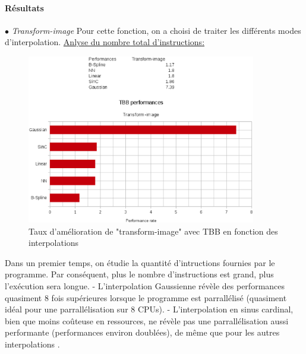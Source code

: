 \documentclass{report}
\begin{document}
\paragraph{Résultats} 
{$\bullet$} \textit{Transform-image} \newline
Pour cette fonction, on a choisi de traiter les différents modes d'interpolation.\newline\newline  
\underline{Anlyse du nombre total d'instructions:} \newline  
\begin{figure}
	\includegraphics[width=10cm]{figures/performances_tbb_transform_image.eps}	
	\caption{Taux d'amélioration de "transform-image" avec TBB en fonction des interpolations}
	\label{Taux d'amélioration de "transform-image" avec TBB en fonction des interpolations}
\end{figure}

Dans un premier temps, on étudie la quantité d'intructions fournies par le programme. Par conséquent, plus le nombre d'instructions est grand, plus l'exécution sera longue.\newline  
- L'interpolation Gaussienne révèle des performances quasiment 8 fois supérieures lorsque le programme est parrallélisé (quasiment idéal pour une parrallélisation sur 8 CPUs).\newline
- L'interpolation en sinus cardinal, bien que moins coûteuse en ressources, ne révèle pas une parrallélisation aussi performante (performances environ doublées), de même que pour les autres interpolations .
\newline
\end{document}
